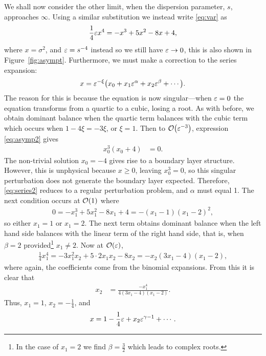 We shall now consider the other limit, when the dispersion parameter, $s$, approaches $\infty$. Using a similar substitution we instead write \eqref{eq:var} as
\begin{align}
\label{eq:asymp2}
\frac{1}{4} \varepsilon x^4 = -x^3 + 5x^2 - 8x + 4,
\end{align}
where $x = \sigma^2$, and $\varepsilon = s^{-4}$ instead so we still have $\varepsilon \rightarrow 0$, this is also shown in Figure~\ref{fig:asympt}. Furthermore, we must make a correction to the series expansion:
\begin{align}
\label{eq:series2}
x = \eps^{-\xi} \left( x_0 + x_1 \eps^\alpha + x_2 \eps^\beta + \cdots \right).
\end{align}
The reason for this is because the equation is now singular---when $\varepsilon=0$ the equation transforms from a quartic to a cubic, losing a root. As with before, we obtain dominant balance when the quartic term balances with the cubic term which occurs when $1 - 4 \xi = -3 \xi$, or $\xi = 1$. Then to $\bigO{\eps^{-3}}$, expression \eqref{eq:asymp2} gives
\begin{align*}
x_0^3 (x_0 + 4) &= 0.
\end{align*}
The non-trivial solution $x_0 = -4$ gives rise to a boundary layer structure. However, this is unphysical because $x \geq 0$, leaving $x_0^3 = 0$, so this singular perturbation does not generate the boundary layer expected. Therefore, \eqref{eq:series2} reduces to a regular perturbation problem, and $\alpha$ must equal 1. The next condition occurs at $\bigO{1}$ where
\begin{align*}
0 = -x_1^3 + 5x_1^2 - 8x_1 + 4 = -(x_1 - 1)(x_1 - 2)^2,
\end{align*}
so either $x_1 = 1$ or $x_1 = 2$. The next term obtains dominant balance when the left hand side balances with the linear term of the right hand side, that is, when $\beta = 2$ provided\footnote{In the case of $x_1 = 2$ we find $\beta = \frac{3}{2}$ which leads to complex roots.} $x_1 \ne 2$. Now at $\bigO{\eps}$,
\begin{align*}
\frac{1}{4} x_1^4 = -3x_1^2 x_2 + 5\cdot2 x_1 x_2 - 8x_2 = -x_2 (3x_1 - 4)(x_1 - 2),
\end{align*}
where again, the coefficients come from the binomial expansions. From this it is clear that
\begin{align*}
x_2 &= \frac{-x_1^4}{4(3x_1 - 4)(x_1 - 2)}.
\end{align*}
Thus, $x_1 = 1$, $x_2 = -\frac{1}{4}$, and
\begin{align*}
x = 1 - \frac{1}{4} \varepsilon + x_2 \varepsilon^{\gamma - 1} + \cdots.
\end{align*}
